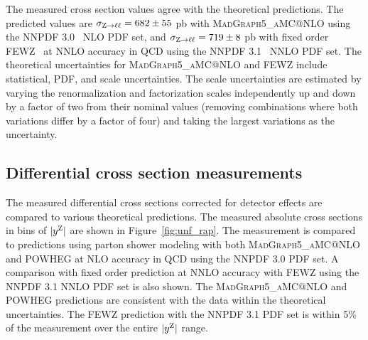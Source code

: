 The measured cross section values agree with the theoretical predictions. The 
predicted values are $\sigma_{\mathrm{Z} \to \ell\ell} = 682 \pm 55$ pb 
with \textsc{MadGraph5\_aMC@NLO} using the NNPDF 3.0~\cite{nnpdf} NLO PDF set, 
and $\sigma_{\mathrm{Z} \to \ell\ell} = 719 \pm 8$ pb with fixed order 
FEWZ~\cite{FEWZ, Gavin:2010az, Gavin:2012sy, Li:2012wna} at NNLO accuracy in 
QCD using the NNPDF 3.1~\cite{Ball:2017nwa} NNLO PDF set. The theoretical 
uncertainties for \textsc{MadGraph5\_aMC@NLO} and FEWZ include statistical, 
PDF, and scale uncertainties. The scale uncertainties are estimated by varying 
the renormalization and factorization scales independently up and down by a 
factor of two from their nominal values (removing combinations where both 
variations differ by a factor of four) and taking the largest variations as 
the uncertainty.     

\clearpage
\subsection{Differential cross section measurements}
The measured differential cross sections corrected for detector effects are 
compared to various theoretical predictions. The measured absolute 
cross sections in bins of $|y^{\mathrm{Z}}|$ are shown in 
Figure~\ref{fig:unf_rap}. The measurement is compared to predictions using 
parton shower modeling with both \textsc{MadGraph5\_aMC@NLO} and \textsc{POWHEG} at 
NLO accuracy in QCD using the NNPDF 3.0 PDF set. A comparison with fixed order 
prediction at NNLO accuracy with FEWZ using the NNPDF 3.1 NNLO PDF set is also 
shown. The \textsc{MadGraph5\_aMC@NLO} and \textsc{POWHEG} predictions are 
consistent with the data within the theoretical uncertainties. The FEWZ 
prediction with the NNPDF 3.1 PDF set is within 5\% of the measurement over 
the entire $|y^{\mathrm{Z}}|$ range.

